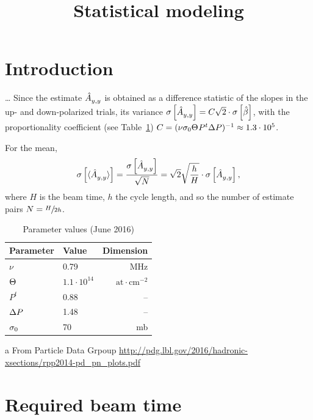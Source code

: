 \documentclass{article}
\newcommand{\Dim}[1]{\mathrm{#1}}
\begin{document}
\title{Statistical modeling}
\maketitle

\section*{Introduction}
\dots
Since the estimate $\Ayy*$ is obtained as a difference statistic of the slopes in the up- and down-polarized trials, its variance $\SE{\Ayy*} = C\sqrt{2}\cdot\SE{\slp*}$, with the proportionality coefficient (see Table~\ref{tbl:Param}) $C = (\nu\CS[0]\Thick P^t\DP)^{-1} \approx 1.3\cdot 10^{5}$. 

For the mean, 
\begin{equation}\label{eq:AvgAyySE}
	\SE{\avg{\Ayy*}} = \frac{\SE{\Ayy*}}{\sqrt N} = \sqrt{2}\sqrt{\frac hH}\cdot\SE{\Ayy*},
\end{equation}
where $H$ is the beam time, $h$ the cycle length, and so the number of estimate pairs $N = \sfrac{H}{2h}$.

\begin{table}
\centering
\caption{Parameter values (June 2016)\label{tbl:Param}}
\begin{threeparttable}[h]
\begin{tabular}{llr}
\hline\hline
Parameter					& Value 				& Dimension \\
\hline
$\nu$						& 0.79 					& MHz \\
$\Thick$					& $1.1\cdot 10^{14}$	& $\Dim{at\cdot cm^{-2}}$ \\
$P^t$						& 0.88					& -- \\
$\DP$						& 1.48					& -- \\
$\CS[0]$\tnote{a}			& 70					& mb\\
\hline
\end{tabular}
\begin{tablenotes}
	\item[a]{From Particle Data Grpoup \url{http://pdg.lbl.gov/2016/hadronic-xsections/rpp2014-pd_pn_plots.pdf}}
\end{tablenotes}
\end{threeparttable}
\end{table}



\section{Required beam time}
\newcommand{\Tint}{\Delta t}
\end{document}
